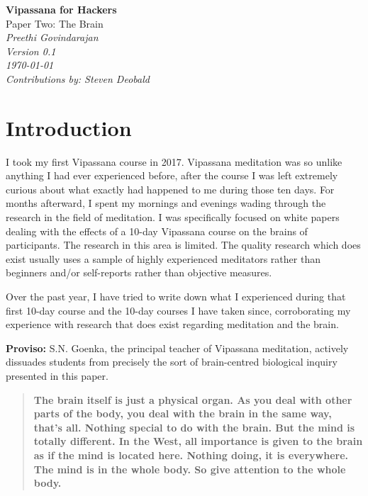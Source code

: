 \documentclass[twocolumn]{article}
\begin{document}
\begin{titlepage}
   \begin{center}
     \Huge\textbf{Vipassana for Hackers}\\
     \Huge{Paper Two: The Brain}\\
     \vspace{5cm}
     \large\textit{Preethi Govindarajan}\\
     \large\textit{Version 0.1}\\
     \large\textit\today\\
     \vspace{5cm}
     \large\textit{Contributions by: Steven Deobald}\\
   \end{center}
\end{titlepage}


\section{Introduction}

I took my first Vipassana course in 2017. Vipassana meditation was so unlike anything
I had ever experienced before, after the course I was left extremely curious
about what exactly had happened to me during those ten days. For months afterward, I
spent my mornings and evenings wading through the research in the field of
meditation. I was specifically focused on white papers dealing with the effects of a
10-day Vipassana course on the brains of participants. The research in this area
is limited. The quality research which does exist usually uses a sample of highly
experienced meditators rather than beginners and/or self-reports rather than
objective measures.

Over the past year, I have tried to write down what I experienced during that first
10-day course and the 10-day courses I have taken since, corroborating my experience
with research that does exist regarding meditation and the brain.

\textbf{Proviso:} S.N. Goenka, the principal teacher of Vipassana meditation,
actively dissuades students from precisely the sort of brain-centred biological
inquiry presented in this paper.

\begin{quote}
  \textbf{The brain itself is just a physical organ. As you deal with other parts of
    the body, you deal with the brain in the same way, that's all. Nothing special to
    do with the brain. But the mind is totally different. In the West, all importance
    is given to the brain as if the mind is located here. Nothing doing, it is
    everywhere. The mind is in the whole body. So give attention to the whole
    body.} \cite{goenkabrain}
\end{quote}
\end{document}
